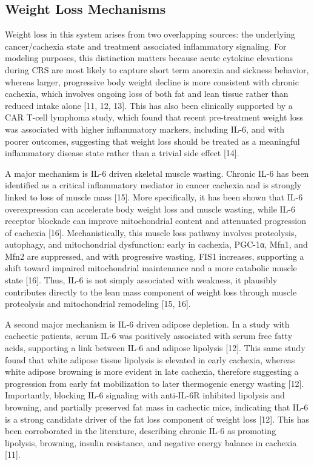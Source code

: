 \documentclass[11pt]{article}
\begin{document}
\subsection{Weight Loss Mechanisms}

Weight loss in this system arises from two overlapping sources: the underlying cancer/cachexia state and treatment associated inflammatory signaling. For modeling purposes, this distinction matters because acute cytokine elevations during CRS are most likely to capture short term anorexia and sickness behavior, whereas larger, progressive body weight decline is more consistent with chronic cachexia, which involves ongoing loss of both fat and lean tissue rather than reduced intake alone [11, 12, 13]. This has also been clinically supported by a CAR T-cell lymphoma study, which found that recent pre-treatment weight loss was associated with higher inflammatory markers, including IL-6, and with poorer outcomes, suggesting that weight loss should be treated as a meaningful inflammatory disease state rather than a trivial side effect [14].
\par\medskip

A major mechanism is IL-6 driven skeletal muscle wasting. Chronic IL-6 has been identified as a critical inflammatory mediator in cancer cachexia and is strongly linked to loss of muscle mass [15]. More specifically, it has been shown that IL-6 overexpression can accelerate body weight loss and muscle wasting, while IL-6 receptor blockade can improve mitochondrial content and attenuated progression of cachexia [16]. Mechanistically, this muscle loss pathway involves proteolysis, autophagy, and mitochondrial dysfunction: early in cachexia, PGC-1α, Mfn1, and Mfn2 are suppressed, and with progressive wasting, FIS1 increases, supporting a shift toward impaired mitochondrial maintenance and a more catabolic muscle state [16]. Thus, IL-6 is not simply associated with weakness, it plausibly contributes directly to the lean mass component of weight loss through muscle proteolysis and mitochondrial remodeling [15, 16].
\par\medskip

A second major mechanism is IL-6 driven adipose depletion. In a study with cachectic patients, serum IL-6 was positively associated with serum free fatty acids, supporting a link between IL-6 and adipose lipolysis [12]. This same study found that white adipose tissue lipolysis is elevated in early cachexia, whereas white adipose browning is more evident in late cachexia, therefore suggesting a progression from early fat mobilization to later thermogenic energy wasting [12]. Importantly, blocking IL-6 signaling with anti-IL-6R inhibited lipolysis and browning, and partially preserved fat mass in cachectic mice, indicating that IL-6 is a strong candidate driver of the fat loss component of weight loss [12]. This has been corroborated in the literature, describing chronic IL-6 as promoting lipolysis, browning, insulin resistance, and negative energy balance in cachexia [11].
\par\medskip
\end{document}

